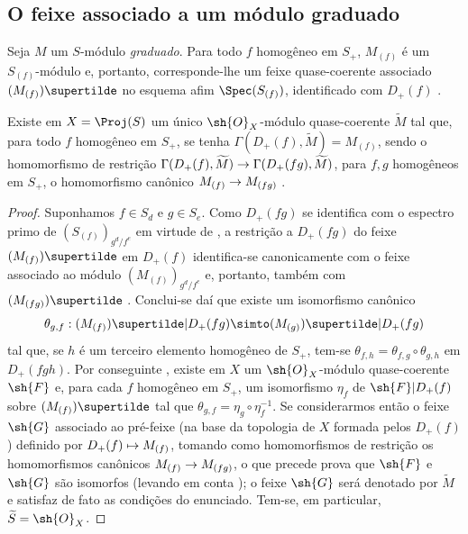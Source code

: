 \documentclass[oneside,10pt]{amsart}
\makeatletter
\newcommand{\ega@arrow}[2]{\mathchoice{#1}{#2}{#2}{#2}}
\let\ega@shortmapsto\mapsto
\renewcommand{\to}{\ega@arrow{\longrightarrow}{\rightarrow}}
\renewcommand{\mapsto}{\ega@arrow{\longmapsto}{\ega@shortmapsto}}
\newcommand{\oldpage}[2][]{\marginnote{\normalfont\footnotesize\textbf{#1}~|~#2}\ignorespaces}
\let\EGAOriginalLabel\label
\renewcommand{\label}[1]{\phantomsection\EGAOriginalLabel{#1}}
\makeatother
\begin{document}
\subsection{O feixe associado a um módulo graduado}
\label{subsection:II.2.5}

\begin{env}[2.5.1]
\label{II.2.5.1}
Seja $M$ um $S$-módulo \emph{graduado}.
Para todo $f$ homogêneo em $S_+$, $M_{(f)}$ é um $S_{(f)}$-módulo e, portanto, corresponde-lhe um feixe quase-coerente associado $(M_{(f)})\supertilde$ no esquema afim $\Spec(S_{(f)})$, identificado com $D_+(f)$ .
\end{env}
\oldpage[II]{31}
\begin{proposition}[2.5.2]
\label{II.2.5.2}
Existe em $X=\Proj(S)$ um único $\sh{O}_X$-módulo quase-coerente $\widetilde{M}$ tal que, para todo $f$ homogêneo em $S_+$, se tenha $\Gamma(D_+(f),\widetilde{M})=M_{(f)}$, sendo o homomorfismo de restrição $\Gamma(D_+(f),\widetilde{M})\to\Gamma(D_+(fg),\widetilde{M})$, para $f,g$ homogêneos em $S_+$, o homomorfismo canônico $M_{(f)}\to M_{(fg)}$ .
\end{proposition}

\begin{proof}
Suponhamos $f\in S_d$ e $g\in S_e$.
Como $D_+(fg)$ se identifica com o espectro primo de $(S_{(f)})_{g^d/f^e}$ em virtude de , a restrição a $D_+(fg)$ do feixe $(M_{(f)})\supertilde$ em $D_+(f)$ identifica-se canonicamente com o feixe associado ao módulo $(M_{(f)})_{g^d/f^e}$  e, portanto, também com $(M_{(fg)})\supertilde$ .
Conclui-se daí que existe um isomorfismo canônico
\[
  \theta_{g,f}:(M_{(f)})\supertilde|D_+(fg)
  \simto(M_{(g)})\supertilde|D_+(fg)
\]
tal que, se $h$ é um terceiro elemento homogêneo de $S_+$, tem-se $\theta_{f,h}=\theta_{f,g}\circ\theta_{g,h}$ em $D_+(fgh)$.
Por conseguinte , existe em $X$ um $\sh{O}_X$-módulo quase-coerente $\sh{F}$ e, para cada $f$ homogêneo em $S_+$, um isomorfismo $\eta_f$ de $\sh{F}|D_+(f)$ sobre $(M_{(f)})\supertilde$ tal que $\theta_{g,f}=\eta_g\circ\eta_f^{-1}$.
Se considerarmos então o feixe $\sh{G}$ associado ao pré-feixe (na base da topologia de $X$ formada pelos $D_+(f)$) definido por $D_+(f)\mapsto M_{(f)}$, tomando como homomorfismos de restrição os homomorfismos canônicos $M_{(f)}\to M_{(fg)}$, o que precede prova que $\sh{F}$ e $\sh{G}$ são isomorfos (levando em conta ); o feixe $\sh{G}$ será denotado por $\widetilde{M}$ e satisfaz de fato as condições do enunciado.
Tem-se, em particular, $\widetilde{S}=\sh{O}_X$.
\end{proof}
\end{document}
